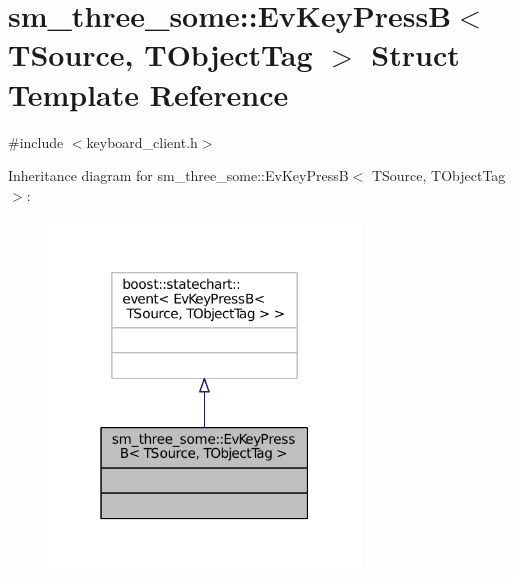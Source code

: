 \hypertarget{structsm__three__some_1_1EvKeyPressB}{}\section{sm\+\_\+three\+\_\+some\+:\+:Ev\+Key\+PressB$<$ T\+Source, T\+Object\+Tag $>$ Struct Template Reference}
\label{structsm__three__some_1_1EvKeyPressB}


{\ttfamily \#include $<$keyboard\+\_\+client.\+h$>$}



Inheritance diagram for sm\+\_\+three\+\_\+some\+:\+:Ev\+Key\+PressB$<$ T\+Source, T\+Object\+Tag $>$\+:
\nopagebreak
\begin{figure}[H]
\begin{center}
\leavevmode
\includegraphics[width=235pt]{structsm__three__some_1_1EvKeyPressB__inherit__graph}
\end{center}
\end{figure}


